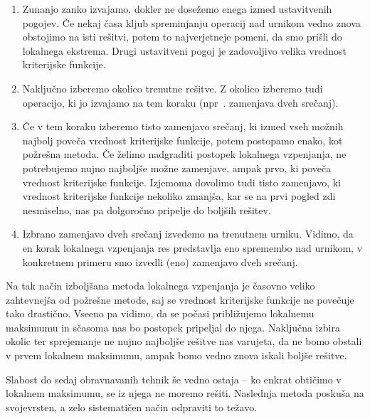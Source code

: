 \documentclass[a4paper, 10pt]{article}
\begin{document}
   \begin{enumerate}
	\item Zunanjo zanko izvajamo, dokler ne dosežemo enega izmed ustavitvenih pogojev.
   Če nekaj časa kljub spreminjanju operacij nad urnikom vedno znova obstojimo na isti
   rešitvi, potem to najverjetneje pomeni, da smo prišli do lokalnega ekstrema. Drugi
   ustavitveni pogoj je zadovoljivo velika vrednost kriterijske funkcije.

   \item Naključno izberemo okolico trenutne rešitve. Z okolico izberemo tudi operacijo,
   ki jo izvajamo na tem koraku (npr~. zamenjava dveh srečanj).

   \item Če v tem koraku izberemo tisto zamenjavo srečanj, ki izmed vseh možnih najbolj
   poveča vrednost kriterijske funkcije, potem postopamo enako, kot požrešna metoda. Če
   želimo nadgraditi postopek lokalnega vzpenjanja, ne potrebujemo nujno najboljše možne
   zamenjave, ampak prvo, ki poveča vrednost kriterijske funkcije. Izjemoma dovolimo tudi
   tisto zamenjavo, ki vrednost kriterijske funkcije nekoliko zmanjša, kar se na prvi
   pogled zdi nesmiselno, nas pa dolgoročno pripelje do boljših rešitev.

   \item Izbrano zamenjavo dveh srečanj izvedemo na trenutnem urniku. Vidimo, da en korak
   lokalnega vzpenjanja res predstavlja eno spremembo nad urnikom, v konkretnem primeru
   smo izvedli (eno) zamenjavo dveh srečanj.
\end{enumerate}
%
Na tak način izboljšana metoda lokalnega vzpenjanja je časovno veliko zahtevnejša od
požrešne metode, saj se vrednost kriterijske funkcije ne povečuje tako drastično. Vseeno
pa vidimo, da se počasi približujemo lokalnemu maksimumu in sčasoma nas bo postopek
pripeljal do njega. Naključna izbira okolic ter sprejemanje ne nujno najboljše rešitve
nas varujeta, da ne bomo obstali v prvem lokalnem maksimumu, ampak bomo vedno znova
iskali boljše rešitve.

Slabost do sedaj obravnavanih tehnik še vedno ostaja -- ko enkrat obtičimo v lokalnem
maksimumu, se iz njega ne moremo rešiti. Naslednja metoda poskuša na svojevrsten, a zelo
sistematičen način odpraviti to težavo.
\end{document}
